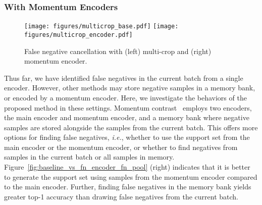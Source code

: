 \documentclass[10pt,twocolumn,letterpaper]{article}
\begin{document}
\vspace{-5pt}
\subsubsection{With Momentum Encoders}
\begin{figure}[t]
    \centering
\texttt{[image: figures/multicrop\_base.pdf]}\hfil
    \texttt{[image: figures/multicrop\_encoder.pdf]}    
    \caption{False negative cancellation with (left) multi-crop and (right) momentum encoder.} \label{fig:multicrop_momentum}
    \vspace{-5pt}
\end{figure}
Thus far, we have identified false negatives in the current batch from a single encoder. However, other methods may store negative samples in a memory bank, or encoded by a momentum encoder. Here, we investigate the behaviors of the proposed method in these settings. Momentum contrast~\cite{he2019moco} employs two encoders, the main encoder and momentum encoder, and a memory bank where negative samples are stored alongside the samples from the current batch. This offers more options for finding false negatives, \emph{i.e.}, whether to use the support set from the main encoder or the momentum encoder, or whether to find negatives from samples in the current batch or all samples in memory. Figure~\ref{fig:baseline_vs_fn_encoder_fn_pool} (right) indicates that it is better to generate the support set using samples from the momentum encoder compared to the main encoder. Further, finding false negatives in the memory bank yields greater top-1 accuracy than drawing false negatives from the current batch.
\end{document}

